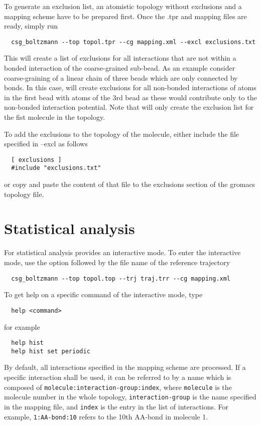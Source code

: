 To generate an exclusion list, an atomistic topology without exclusions and a mapping scheme have to be prepared first. Once the .tpr and mapping files are ready, simply run
\begin{verbatim}
  csg_boltzmann --top topol.tpr --cg mapping.xml --excl exclusions.txt
\end{verbatim}
This will create a list of exclusions for all interactions that are not within a bonded interaction of the coarse-grained sub-bead. As an example consider coarse-graining of a linear chain of three beads  which are only connected by bonds. In this case,  will create exclusions for all non-bonded interactions of atoms in the first bead with atoms of the 3rd bead as these would contribute only to the non-bonded interaction potential. Note that  will only create the exclusion list for the fist molecule in the topology.

To add the exclusions to the \gromacs topology of the molecule, either include the file specified in --excl as follows
\begin{verbatim}
  [ exclusions ]
  #include "exclusions.txt"
\end{verbatim}
or copy and paste the content of that file to the exclusions section of the gromacs topology file.

\section{Statistical analysis}
For statistical analysis  provides an interactive mode. To enter the interactive mode, use the  option followed by the file name of the reference trajectory 
\begin{verbatim}
  csg_boltzmann --top topol.top --trj traj.trr --cg mapping.xml
\end{verbatim}
%
To get help on a specific command of the interactive mode, type
\begin{verbatim}
  help <command>
\end{verbatim}
for example
\begin{verbatim}
  help hist
  help hist set periodic
\end{verbatim}
%
By default, all interactions specified in the mapping scheme are processed. If a specific interaction shall be used, it can be referred to by a name which is composed of \texttt{molecule:interaction-group:index}, where \texttt{molecule} is the molecule number in the whole topology, \texttt{interaction-group} is the name specified in the mapping file, and \texttt{index} is the entry in the list of interactions. For example, \texttt{1:AA-bond:10} refers to the 10th AA-bond in molecule 1. 

